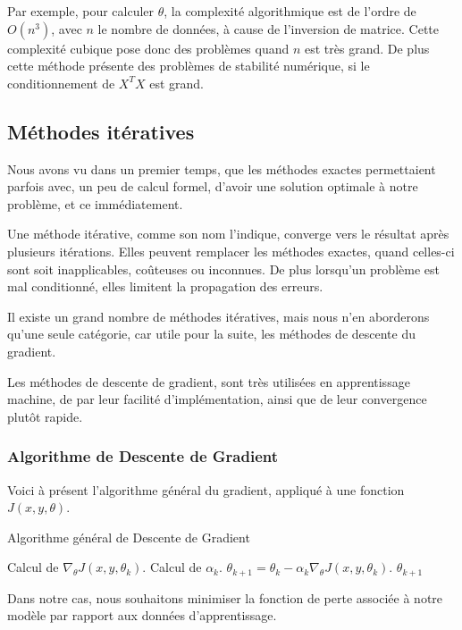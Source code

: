 \documentclass[a4paper, 11pt]{report}
\begin{document}
Par exemple, pour calculer $\theta$, la complexité algorithmique est de l'ordre de $O(n^3)$, avec $n$ le nombre de données, à cause de l'inversion de matrice.
Cette complexité cubique pose donc des problèmes quand $n$ est très grand.
De plus cette méthode présente des problèmes de stabilité numérique, si le conditionnement de $X^TX$ est grand.
		
\subsection{Méthodes itératives}
Nous avons vu dans un premier temps, que les méthodes exactes permettaient parfois avec, un peu de calcul formel, d'avoir une solution optimale à notre problème, et ce immédiatement.

Une méthode itérative, comme son nom l'indique, converge vers le résultat après plusieurs itérations.
Elles peuvent remplacer les méthodes exactes, quand celles-ci sont soit inapplicables, coûteuses ou inconnues. De plus lorsqu'un problème est mal conditionné, elles limitent la propagation des erreurs.

Il existe un grand nombre de méthodes itératives, mais nous n'en aborderons qu'une seule catégorie, car utile pour la suite, les méthodes de descente du gradient.

Les méthodes de descente de gradient, sont très utilisées en apprentissage machine, de par leur facilité d'implémentation, ainsi que de leur convergence plutôt rapide.
\subsubsection{Algorithme de Descente de Gradient}
Voici à présent l'algorithme général du gradient, appliqué à une fonction $J(x,y,\theta)$.
\begin{algorithm}[H]
	\caption{Algorithme général de Descente de Gradient}
	\begin{algorithmic}
		\REPEAT
		\STATE Calcul de $\nabla_\theta J(x,y,\theta_k)$.
		\STATE Calcul de $\alpha_k$.
		\STATE $\theta_{k+1} = \theta_k - \alpha_k \nabla_\theta J(x,y,\theta_k)$.
		\RETURN $\theta_{k+1}$
	\end{algorithmic}
\end{algorithm}
Dans notre cas, nous souhaitons minimiser la fonction de perte associée à notre modèle par rapport aux données d'apprentissage.
\end{document}
